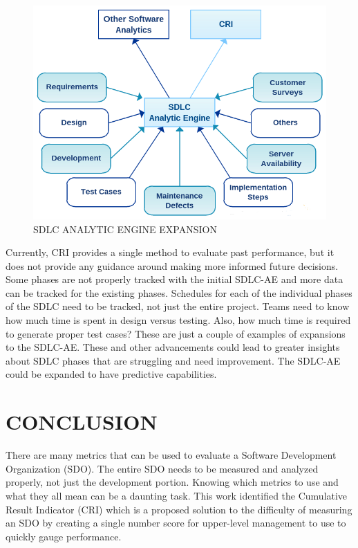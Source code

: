 \documentclass[SDSUThesis.tex]{subfiles}
\begin{document}
    \begin{figure}[ht]
    \includegraphics[scale=.75]{images/sdlcae-adv.png}
    \caption{SDLC ANALYTIC ENGINE EXPANSION}
    \label{fig:sdlc-ae-adv}
    \end{figure}
    
    Currently, CRI provides a single method to evaluate past 
    performance, but it does not
    provide any guidance around making more informed future decisions. 
    Some phases are not properly tracked with the initial SDLC-AE and more
    data can be tracked for the existing phases.
    Schedules for each of the individual phases of the SDLC need to be tracked,
    not just the entire project.  Teams need to know how much time is spent
    in design versus testing.  Also, how much time is required to generate
    proper test cases?  These are just a couple of examples of expansions
    to the SDLC-AE.  These and other advancements could lead to greater
    insights about SDLC phases that are struggling and need improvement.
    The SDLC-AE could be expanded to have predictive capabilities.


\section{CONCLUSION}

    There are many metrics that can be used to evaluate a Software
    Development Organization (SDO). The entire SDO needs to be measured 
    and analyzed properly, not just the development portion. 
    Knowing which metrics to use and what they all mean can be a daunting task.  
    This work identified the Cumulative Result Indicator (CRI) which is a
    proposed solution to the difficulty of measuring an SDO by creating a
    single number score for upper-level management to use to quickly gauge
    performance. 
    
\end{document}
